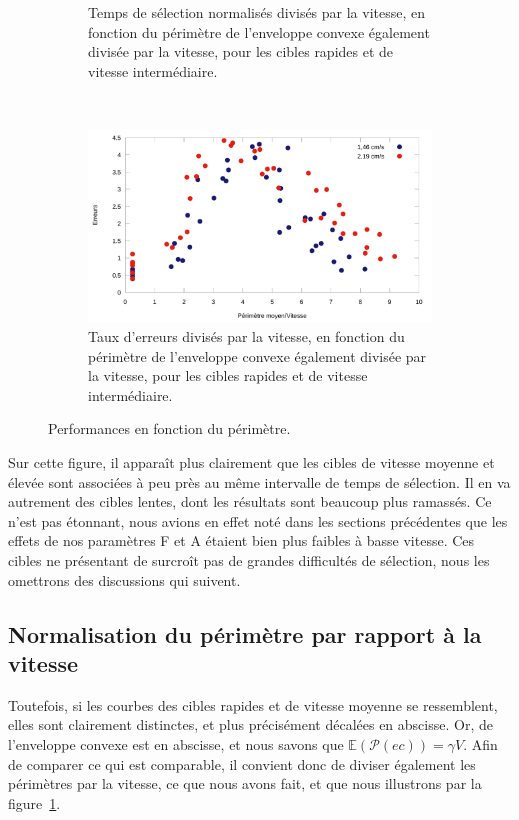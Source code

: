 \begin{figure}[!htb]
\begin{subfigure}[t]{0.485\textwidth}
			\caption{Temps de sélection normalisés divisés par la vitesse, en fonction du périmètre de l'enveloppe convexe également divisée par la vitesse, pour les cibles rapides et de vitesse intermédiaire.}
			\label{fig:perfVareaEverythingNormed}
		\end{subfigure}
		~
		\begin{subfigure}[t]{0.485\textwidth}
			\centering
			\includegraphics[width=\textwidth]{figures/ch4/errorsVareaEverythingNormed}
			\caption[Taux d'erreurs/V en fonction de $\mathbb{E}(\mathcal{P}(ec))/V$]{Taux d'erreurs divisés par la vitesse, en fonction du périmètre de l'enveloppe convexe également divisée par la vitesse, pour les cibles rapides et de vitesse intermédiaire.}
			\label{fig:errorsVareaEverythingNormed}
		\end{subfigure}
		\caption[Performances en fonction du périmètre]{Performances en fonction du périmètre.}
		\label{fig:perfVareaTimeVariousNorms}
	\end{figure}
	
	Sur cette figure, il apparaît plus clairement que les cibles de vitesse moyenne et élevée sont associées à peu près au même intervalle de temps de sélection. Il en va autrement des cibles lentes, dont les résultats sont beaucoup plus ramassés. Ce n'est pas étonnant, nous avions en effet noté dans les sections précédentes que les effets de nos paramètres F et A étaient bien plus faibles à basse vitesse. Ces cibles ne présentant de surcroît pas de grandes difficultés de sélection, nous les omettrons des discussions qui suivent.
	
	\subsection{Normalisation du périmètre par rapport à la vitesse}
	Toutefois, si les courbes des cibles rapides et de vitesse moyenne se ressemblent, elles sont clairement distinctes, et plus précisément décalées en abscisse. Or,  de l'enveloppe convexe est en abscisse, et nous savons que $\mathbb{E}(\mathcal{P}(ec)) = \gamma{}V$. Afin de comparer ce qui est comparable, il convient donc de diviser également les périmètres par la vitesse, ce que nous avons fait, et que nous illustrons par la figure~\ref{fig:perfVareaEverythingNormed}.
	
